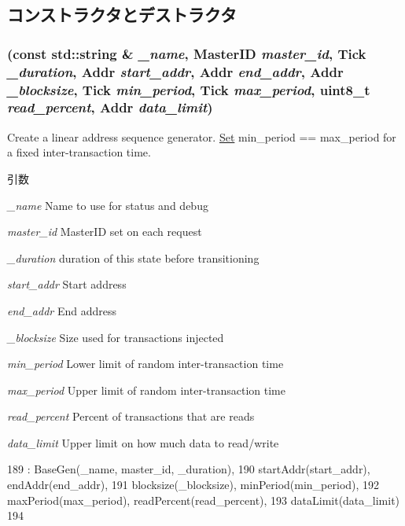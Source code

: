 \subsection{コンストラクタとデストラクタ}
\hypertarget{classLinearGen_a8b696a23a093c2b9afcdf1826af1966a}{
\subsubsection[{LinearGen}]{ (const std::string \& {\em \_\-name}, \/  {\bf MasterID} {\em master\_\-id}, \/  {\bf Tick} {\em \_\-duration}, \/  {\bf Addr} {\em start\_\-addr}, \/  {\bf Addr} {\em end\_\-addr}, \/  {\bf Addr} {\em \_\-blocksize}, \/  {\bf Tick} {\em min\_\-period}, \/  {\bf Tick} {\em max\_\-period}, \/  uint8\_\-t {\em read\_\-percent}, \/  {\bf Addr} {\em data\_\-limit})}}
\label{classLinearGen_a8b696a23a093c2b9afcdf1826af1966a}
Create a linear address sequence generator. \hyperlink{classSet}{Set} min\_\-period == max\_\-period for a fixed inter-\/transaction time.


\begin{DoxyParams}{引数}
\item[{\em \_\-name}]Name to use for status and debug \item[{\em master\_\-id}]MasterID set on each request \item[{\em \_\-duration}]duration of this state before transitioning \item[{\em start\_\-addr}]Start address \item[{\em end\_\-addr}]End address \item[{\em \_\-blocksize}]Size used for transactions injected \item[{\em min\_\-period}]Lower limit of random inter-\/transaction time \item[{\em max\_\-period}]Upper limit of random inter-\/transaction time \item[{\em read\_\-percent}]Percent of transactions that are reads \item[{\em data\_\-limit}]Upper limit on how much data to read/write \end{DoxyParams}



\begin{DoxyCode}
189         : BaseGen(_name, master_id, _duration),
190           startAddr(start_addr), endAddr(end_addr),
191           blocksize(_blocksize), minPeriod(min_period),
192           maxPeriod(max_period), readPercent(read_percent),
193           dataLimit(data_limit)
194     { }
\end{DoxyCode}


